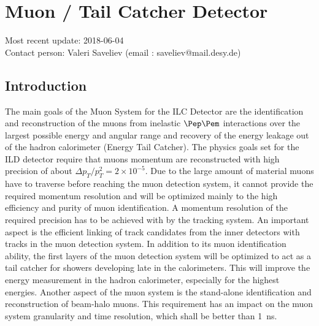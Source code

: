 \section{Muon / Tail Catcher Detector}
Most recent update: 2018-06-04 \\
Contact person: Valeri Saveliev (email : saveliev@mail.desy.de)

\subsection{Introduction}
The main goals of the Muon System for the ILC Detector are the identification and reconstruction of the muons from inelastic $\Pep\Pem$ interactions over the largest possible energy and angular range and recovery of the energy leakage out of the hadron calorimeter (Energy Tail Catcher).
The physics goals set for the ILD detector require that muons momentum are reconstructed with high precision of about $\Delta p_T/p^2_T = 2 \times10^{-5}$.
Due to the large amount of material muons have to traverse before reaching the muon detection system, it cannot provide the required momentum resolution and will be optimized mainly to the high efficiency and purity of muon identification.
A momentum resolution of the required precision has to be achieved with by the tracking system. An important aspect is the efficient linking of track candidates from the inner detectors with tracks in the muon detection system.
In addition to its muon identification ability, the first layers of the muon detection system will be optimized to act as a tail catcher for showers developing late in the calorimeters. This will improve the energy measurement in the hadron calorimeter, especially for the highest energies.
Another aspect of the muon system is the stand-alone identification and reconstruction of beam-halo muons. This requirement has an impact on the muon system granularity and time resolution, which shall be better than \SI{1}{ns}.


